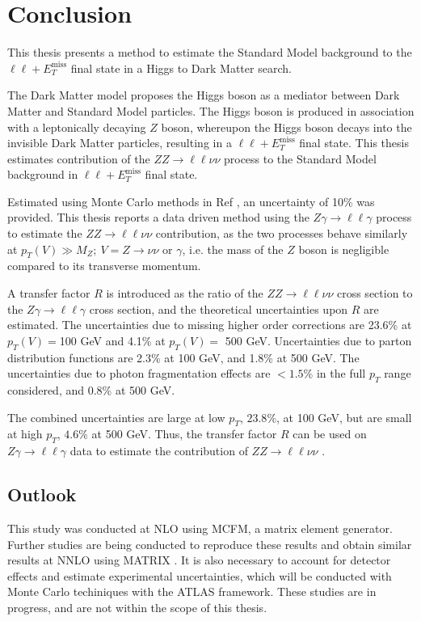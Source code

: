 \documentclass[12pt,a4paper,openright,twoside]{report}
\newcommand{\ZZ}{$ZZ\to \ell\ell\nu\nu$ }
\newcommand{\Zg}{$Z\gamma\to \ell\ell\gamma$ }
\newcommand{\llM}{$\ell\ell+E_T^{\mathrm{miss}}$ }
\begin{document}
\chapter{Conclusion}
This thesis presents a method to estimate the Standard Model background to the \llM final state in a Higgs to Dark Matter search. 

The Dark Matter model proposes the Higgs boson as a mediator between Dark Matter and Standard Model particles. The Higgs boson is produced in association with a leptonically decaying $Z$ boson, whereupon the Higgs boson decays into the invisible Dark Matter particles, resulting in a \llM final state. This thesis estimates contribution of the \ZZ process to the Standard Model background in \llM final state.

Estimated using Monte Carlo methods in Ref \cite{ZH_ATLAS}, an uncertainty of 10\% was provided. This thesis reports a data driven method using the \Zg process to estimate the \ZZ contribution, as the two processes behave similarly at $p_T(V) \gg M_Z;\ V=Z\to\nu\nu$ or $\gamma$, i.e. the mass of the $Z$ boson is negligible compared to its transverse momentum.

A transfer factor $R$ is introduced as the ratio of the \ZZ cross section to the \Zg cross section, and the theoretical uncertainties upon $R$ are estimated. The uncertainties due to missing higher order corrections are 23.6\% at $p_T(V)=$100 GeV and 4.1\% at $p_T(V)=$ 500 GeV. Uncertainties due to parton distribution functions are 2.3\% at 100 GeV, and 1.8\% at 500 GeV. The uncertainties due to photon fragmentation effects are $<1.5\%$ in the full $p_T$ range considered, and 0.8\% at 500 GeV. 

The combined uncertainties are large at low $p_T$, $23.8\%$, at 100 GeV, but are small at high $p_T$, $4.6\%$ at 500 GeV. Thus, the transfer factor $R$ can be used on \Zg data to estimate the contribution of \ZZ.

\section{Outlook}
This study was conducted at NLO using MCFM, a matrix element generator. Further studies are being conducted to reproduce these results and obtain similar results at NNLO using MATRIX \cite{MATRIX}. It is also necessary to account for detector effects and estimate experimental uncertainties, which will be conducted with Monte Carlo techiniques with the ATLAS framework. These studies are in progress, and are not within the scope of this thesis.
\end{document}

